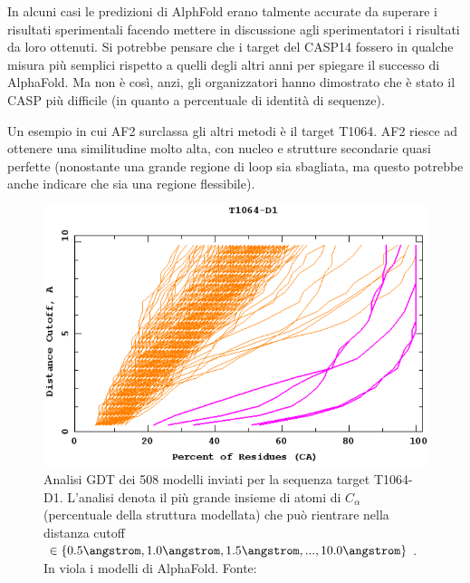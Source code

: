 In alcuni casi le predizioni di AlphFold erano talmente accurate da superare i risultati sperimentali facendo mettere in discussione agli sperimentatori i risultati da loro ottenuti. Si potrebbe pensare che i target del CASP14 fossero in qualche misura più semplici rispetto a quelli degli altri anni per spiegare il successo di AlphaFold. Ma non è così, anzi, gli organizzatori hanno dimostrato che è stato il CASP più difficile (in quanto a percentuale di identità di sequenze).

Un esempio in cui AF2 surclassa gli altri metodi è il target T1064. AF2 riesce ad ottenere una similitudine molto alta, con nucleo e strutture secondarie quasi perfette (nonostante una grande regione di loop sia sbagliata, ma questo potrebbe anche indicare che sia una regione flessibile).

\begin{figure}[!htb]
	\centering
	\includegraphics[scale=0.3]{images/t1064-af2.png}
	\caption{Analisi GDT dei 508 modelli inviati per la sequenza target T1064-D1. L'analisi denota il più grande insieme di atomi di $C_{\alpha}$ (percentuale della struttura modellata) che può rientrare nella distanza cutoff $ \in \{ 0.5 \angstrom, 1.0 \angstrom, 1.5 \angstrom, ... , 10.0 \angstrom \} $. In viola i modelli di AlphaFold. Fonte: \cite{CaspRes}}
	\label{fig:t1064-chart}
	\endminipage\hfill
	\centering

\end{figure}

